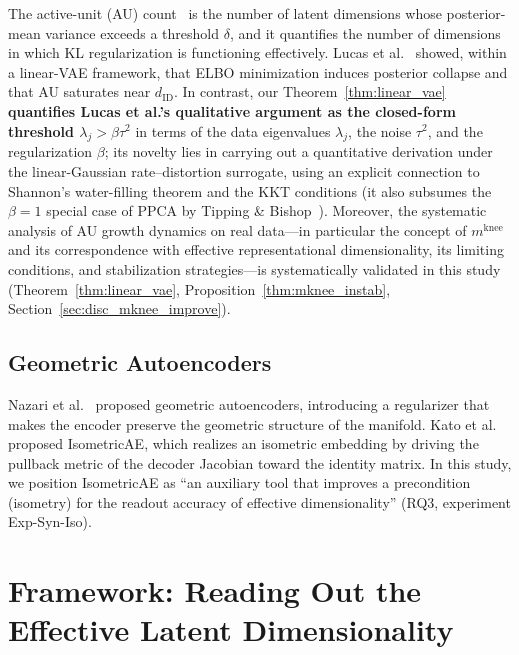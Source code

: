\documentclass[make,article,submit,pdftex,moreauthors]{Definitions/mdpi}
\newcommand{\mknee}{m^{\mathrm{knee}}}
\begin{document}
The active-unit (AU) count~\cite{lucas2019elbo,higgins2017betavae} is the
number of latent dimensions whose posterior-mean variance exceeds a threshold
$\delta$, and it quantifies the number of dimensions in which KL regularization
is functioning effectively.
Lucas et al.~\cite{lucas2019elbo} showed, within a linear-VAE framework, that
ELBO minimization induces posterior collapse and that AU saturates near
$d_{\mathrm{ID}}$.
In contrast, our Theorem~\ref{thm:linear_vae} \textbf{quantifies Lucas et al.'s
qualitative argument as the closed-form threshold $\lambda_j > \beta\tau^2$}
in terms of the data eigenvalues $\lambda_j$, the noise $\tau^2$, and the
regularization $\beta$; its novelty lies in carrying out a quantitative
derivation under the linear-Gaussian rate--distortion surrogate, using an
explicit connection to Shannon's water-filling theorem and the KKT conditions
(it also subsumes the $\beta=1$ special case of PPCA by Tipping \&
Bishop~\cite{tippingbishop1999ppca}).
Moreover, the systematic analysis of AU growth dynamics on real data---in
particular the concept of $\mknee$ and its correspondence with effective
representational dimensionality, its limiting conditions, and stabilization
strategies---is systematically validated in this study
(Theorem~\ref{thm:linear_vae}, Proposition~\ref{thm:mknee_instab},
Section~\ref{sec:disc_mknee_improve}).

\subsection{Geometric Autoencoders}\label{sec:related_geo}

Nazari et al.~\cite{nazari2023geometric} proposed geometric autoencoders,
introducing a regularizer that makes the encoder preserve the geometric
structure of the manifold.
Kato et al.~\cite{kato2020rdae} proposed IsometricAE, which realizes an
isometric embedding by driving the pullback metric of the decoder Jacobian
toward the identity matrix.
In this study, we position IsometricAE as ``an auxiliary tool that improves a
precondition (isometry) for the readout accuracy of effective dimensionality''
(RQ3, experiment Exp-Syn-Iso).

\section{Framework: Reading Out the Effective Latent Dimensionality}\label{sec:framework}
\end{document}
